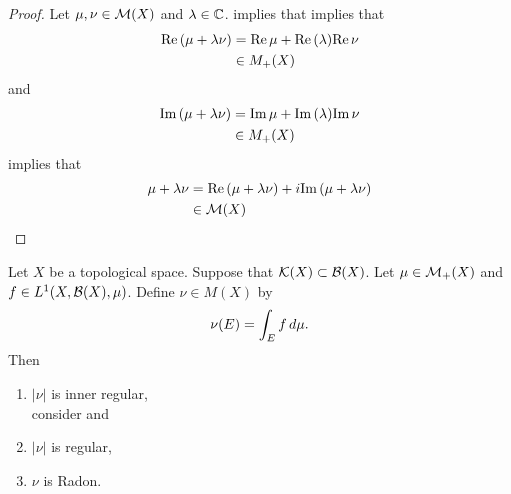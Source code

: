 \documentclass{book}
\begin{document}
	\begin{proof}
		Let $\mu, \nu \in \mathcal{M}(X)$ and $\lambda \in \mathbb{C}$.  implies that   implies that
		\begin{align*}
			\text{Re} \, (\mu + \lambda \nu) 
			& = \text{Re} \, \mu + \text{Re} \,(\lambda) \text{Re} \, \nu \\
			& \in M_+(X)
		\end{align*}
		and 
		\begin{align*}
			\text{Im} \, (\mu + \lambda \nu) 
			& = \text{Im} \, \mu + \text{Im} \,(\lambda) \text{Im} \, \nu \\
			& \in M_+(X)
		\end{align*}  
		 implies that 
		\begin{align*}
			\mu + \lambda \nu 
			& = \text{Re} \, (\mu + \lambda \nu)  + i \text{Im} \, (\mu + \lambda \nu) \\
			& \in \mathcal{M}(X)
		\end{align*}
	\end{proof}

	\begin{ex}  
		Let $X$ be a topological space. Suppose that $\mathcal{K}(X) \subset \mathcal{B}(X)$. Let $\mu \in \mathcal{M}_+(X)$ and $f \in L^1(X, \mathcal{B}(X), \mu)$. Define $\nu \in M(X)$ by 
		$$\nu(E) = \int_E f \, d \mu.$$
		Then 
		\begin{enumerate}
			\item $|\nu|$ is inner regular, \\
			 consider  and  
			\item $|\nu|$ is regular,
			\item $\nu$ is Radon.
		\end{enumerate}
	\end{ex}
	
\end{document}
